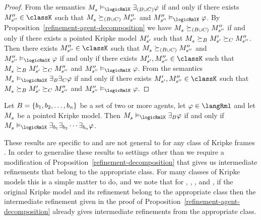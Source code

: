 \begin{proof}
From the semantics $\kPModel{\kStateS} \entails_\logicRmlK \somerefs[(\agentsB \cup \agentsC)] \phi$ if and only if there exists $\kPModelPP{\kStateSPP} \in \classK$ such that $\kPModel{\kStateS} \simulates[(\agentsB \cup \agentsC)] \kPModelPP{\kStateSPP}$ and $\kPModelPP{\kStateSPP} \entails_\logicRmlK \phi$.
By Proposition~\ref{refinement-agent-decomposition} we have $\kPModel{\kStateS} \simulates[(\agentsB \cup \agentsC)] \kPModelPP{\kStateSPP}$ if and only if there exists a pointed Kripke model ${M^{\prime}_{{s}^{\prime}}}$ such that $\kPModel{\kStateS} \simulatesBs \kPModelP{\kStateSP} \simulatesCs \kPModelPP{\kStateSPP}$.
Then there exists $\kPModelPP{\kStateSPP} \in \classK$ such that $\kPModel{\kStateS} \simulates[(\agentsB \cup \agentsC)] \kPModelPP{\kStateSPP}$ and $\kPModelPP{\kStateSPP} \entails_\logicRmlK \phi$
if and only if
there exists $\kPModelP{\kStateSP}, \kPModelPP{\kStateSPP} \in \classK$ such that $\kPModel{\kStateS} \simulatesBs \kPModelP{\kStateSP} \simulatesCs \kPModelPP{\kStateSPP}$ and $\kPModelPP{\kStateSPP} \entails_\logicRmlK \phi$.
From the semantics $\kPModel{\kStateS} \entails_\logicRmlK \somerefsBs \somerefsCs \phi$ if and only if there exists $\kPModelP{\kStateSP}, \kPModelPP{\kStateSPP} \in \classK$ such that $\kPModel{\kStateS} \simulatesBs \kPModelP{\kStateSP} \simulatesCs \kPModelPP{\kStateSPP}$ and $\kPModelPP{\kStateSPP} \entails_\logicRmlK \phi$.
\end{proof}

\begin{corollary}
Let $B = \{b_1, b_2, \dots, b_n\}$ be a set of two or more agents, let $\phi \in \langRml$ and let $\kPModel{\kStateS}$ be a pointed Kripke model.
Then $\kPModel{\kStateS} \entails_\logicRmlK \somerefsBs \phi$ if and only if $\kPModel{\kStateS} \entails_\logicRmlK \somerefs[\agentB_1] \somerefs[\agentB_2] \cdots \somerefs[\agentB_n] \phi$.
\end{corollary}

These results are specific to \logicRmlK{} and are not general to \logicRmlC{} for any class of Kripke frames \classC{}.
In order to generalise these results to settings other than \classK{} we require a modification of Proposition~\ref{refinement-decomposition} that gives us intermediate refinements that belong to the appropriate class.
For many classes of Kripke models this is a simple matter to do, and we note that for \classKF{}, \classKFF{}, \classKD{}, and \classS{}, if the original Kripke model and its refinement belong to the appropriate class then the intermediate refinement given in the proof of Proposition~\ref{refinement-agent-decomposition} already gives intermediate refinements from the appropriate class.

